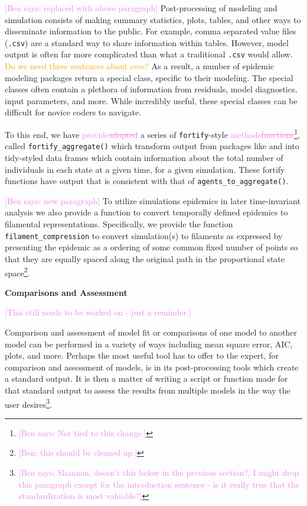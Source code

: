 \documentclass[
  shortnames]{jss}
\begin{document}
\textcolor{violet}{[Ben says: replaced with above paragraph]}
Post-processing of modeling and simulation consists of making summary
statistics, plots, tables, and other ways to disseminate information to
the public. For example, comma separated value files (\texttt{.csv}) are
a standard way to share information within tables. However, model output
is often far more complicated than what a traditional \texttt{.csv}
would allow. \textcolor{orange}{Do we need three sentences about csvs?}
As a result, a number of epidemic modeling packages return a special
class, specific to their modeling. The special classes often contain a
plethora of information from residuals, model diagnostics, input
parameters, and more. While incredibly useful, these special classes can
be difficult for novice coders to navigate.

To this end, we have \textcolor{violet}{provide\sout{adapted}} a series
of \texttt{fortify}-style
\textcolor{violet}{methods\sout{functions}}\footnote{\textcolor{violet}{[Ben says: Not tied to this change.]}},
called \texttt{fortify\_aggregate()} which transform output from
packages like  and  into tidy-styled data frames
which contain information about the total number of individuals in each
state at a given time, for a given simulation. These fortify functions
have output that is consistent with that of
\texttt{agents\_to\_aggregate()}.

\textcolor{violet}{[Ben says: new paragraph]} To utilize simulations
epidemics in later time-invariant analysis we also provide a function to
convert temporally defined epidemics to filamental representations.
Specifically, we provide the function \texttt{filament\_compression} to
convert simulation(s) to filaments as expressed by presenting the
epidemic as a ordering of some common fixed number of points so that
they are equally spaced along the original path in the proportional
state
space\footnote{\textcolor{violet}{[Ben: this should be cleaned up.]}}.

\textbf{Comparisons and Assessment}

\textcolor{violet}{[This still needs to be worked on - just a reminder.]}

Comparison and assessment of model fit or comparisons of one model to
another model can be performed in a variety of ways including mean
square error, AIC, plots, and more. Perhaps the most useful tool
 has to offer to the expert, for comparison and
assessment of models, is in its post-processing tools which create a
standard output. It is then a matter of writing a script or function
made for that standard output to assess the results from multiple models
in the way the user
desires\footnote{\textcolor{violet}{[Ben says: Shannon, doesn't this below in the previous section?, I might drop this paragraph except for the introduction sentence - is it really true that the standardization is most valuable?]}}.
\end{document}
